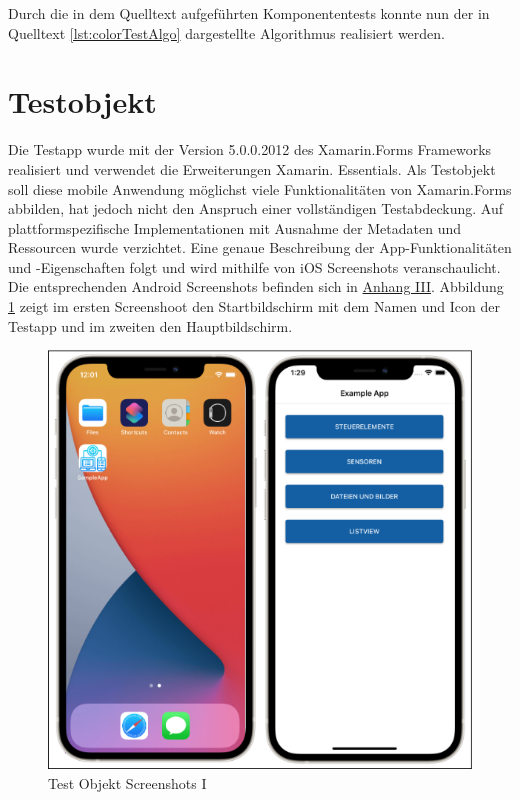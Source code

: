 Durch die in dem Quelltext aufgeführten Komponententests konnte nun der in Quelltext \ref{lst:colorTestAlgo} dargestellte Algorithmus realisiert werden. 
\newpage




\section{Testobjekt}
Die Testapp wurde mit der Version 5.0.0.2012 des Xamarin.Forms Frameworks realisiert und verwendet die Erweiterungen Xamarin. Essentials.  Als Testobjekt soll diese mobile Anwendung möglichst viele Funktionalitäten von Xamarin.Forms abbilden,  hat jedoch nicht den Anspruch einer vollständigen Testabdeckung.
Auf plattformspezifische Implementationen mit Ausnahme der Metadaten und Ressourcen wurde verzichtet.  Eine genaue Beschreibung der App-Funktionalitäten und -Eigenschaften folgt und wird mithilfe von iOS Screenshots veranschaulicht.  Die entsprechenden Android Screenshots befinden sich in \hyperref[chap:AnhangAndroidScreenshots]{Anhang III}.  Abbildung \ref{fig:TestObjectI} zeigt im ersten Screenshoot den Startbildschirm mit dem Namen und Icon der Testapp und im zweiten den Hauptbildschirm.  


\begin{figure}[!ht]
 \includegraphics[width=\textwidth,keepaspectratio]{Images/Screenshot/AppIconAndMenu.png}
 \caption{Test Objekt Screenshots I}
 \label{fig:TestObjectI}
\end{figure}

